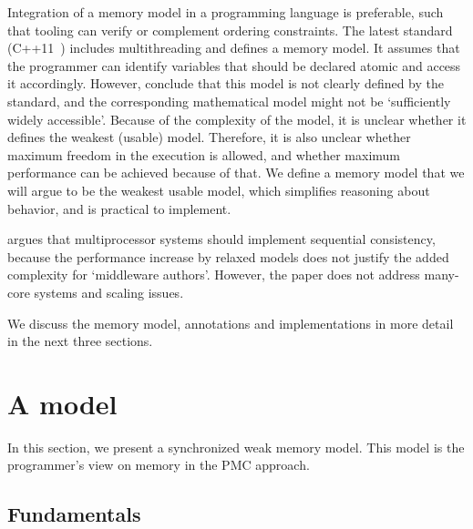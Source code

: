 Integration of a memory model in a programming language is preferable, such that tooling can verify or complement ordering constraints.
The latest  standard (C++11~\cite{C++11}) includes multithreading and defines a memory model.
It assumes that the programmer can identify variables that should be declared atomic and access it accordingly.
However, \citet{batty:math_cpp_concurrency} conclude that this model is not clearly defined by the standard, and the corresponding mathematical model might not be `sufficiently widely accessible'.
Because of the complexity of the model, it is unclear whether it defines the weakest (usable) model.
Therefore, it is also unclear whether maximum freedom in the execution is allowed, and whether maximum performance can be achieved because of that.
We define a memory model that we will argue to be the weakest usable model, which simplifies reasoning about behavior, and is practical to implement.

 argues that multiprocessor systems should implement sequential consistency, because the performance increase by relaxed models does not justify the added complexity for `middleware authors'.
However, the paper does not address many-core systems and scaling issues.

We discuss the memory model, annotations and implementations in more detail in the next three sections.


\section{A  model}

\label{s:memory:model}%
%
%
%
%
%
%

In this section, we present a synchronized weak memory model.
This model is the programmer's view on memory in the \ac{PMC} approach.

\subsection{Fundamentals}

